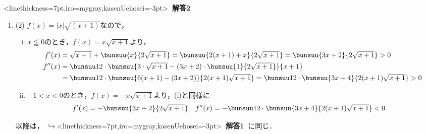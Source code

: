 \documentclass[10pt,
b5paper,
fleqn,
dvipdfmx,
uplatex
]{jsarticle}
\newcommand{\benu}{\begin{enumerate}}
\newcommand{\eenu}{\end{enumerate}}
\newcommand{\bb}{\bf\boldmath}%
\newcommand{\sq}{\textstyle\sqrt}
\newenvironment{leftbbar}{%
\def\FrameCommand{\color{mygray} \vrule width 5pt \hspace{1zw}
\color{black}}%
\MakeFramed {\advance\hsize-\width \FrameRestore}}%
{\endMakeFramed}
\newenvironment{解答2}{
\hspace{-2zw}\phkasen<linethickness=7pt,iro=mygray,kasenUehosei=-3pt>{\bf \large \ 解答2\ }\vspace{-1zw}\begin{leftbbar}}{\end{leftbbar}}
\newcommand{\kaitoui}{{\bb \color{mygray} $\hookrightarrow$}\phkasen<linethickness=7pt,iro=mygray,kasenUehosei=-3pt>{\bf \ 解答1\ }}
\begin{document}
{\begin{解答2}
\benu
\item[(2)] $f(x)=|x|\sq{(x+1)}$なので，
\benu[(i)]
\item $x \leqq 0$のとき，$f(x)=x\sq{x+1}$より，
\begin{align*}
f'(x)&=\sq{x+1}+\bunsuu{x}{2\sq{x+1}}=\bunsuu{2(x+1)+x}{2\sq{x+1}}=\bunsuu{3x+2}{2\sq{x+1}}>0\\
f''(x)&=\bunsuu 12 \cdot \bunsuu{3\cdot \sq{x+1}-(3x+2) \cdot \bunsuu{1}{2\sq{x+1}}}{x+1}\\
&=\bunsuu 12 \cdot \bunsuu{6(x+1)-(3x+2)}{2(x+1)\sq{x+1}}
=\bunsuu 12 \cdot \bunsuu{3x+4}{2(x+1)\sq{x+1}}>0
\end{align*}
\item $-1< x < 0$のとき，$f(x)=-x\sq{x+1}$より，(i)と同様に
\begin{align*}
f'(x)&=-\bunsuu{3x+2}{2\sq{x+1}}&
f''(x)&=-\bunsuu 12 \cdot \bunsuu{3x+4}{2(x+1)\sq{x+1}}<0
\end{align*}
\eenu
以降は，\kaitoui に同じ．
\eenu
\end{解答2}

}
\end{document}
